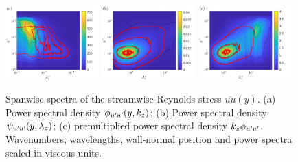 \begin{figure}[h!]
\centering
\includegraphics[width=0.32\textwidth ]{imgs/spec/ZPG_Ret_500_2000_PSdkz_kz_ltau_y_ltau.jpg}
\includegraphics[width=0.32\textwidth]{imgs/spec/ZPG_Ret_500_2000_PSdlambdaz_lambdaz_ltau_y_ltau.jpg}
\includegraphics[width=0.32\textwidth]{imgs/spec/ZPG_Ret_500_2000_kPSdkz_lambdaz_ltau_y_ltau.jpg}
\caption{ \label{fig:PS_PSD} Spanwise spectra of the streamwise Reynolds stress $\overline{uu}(y)$. (a) Power spectral density $\phi_{u^{\prime}\mkern-1.2mu u^{\prime}\mkern-1.2mu}(y,k_z)$; (b) Power spectral density $\psi_{u^{\prime}\mkern-1.2mu u^{\prime}\mkern-1.2mu}(y,\lambda_z)$; (c) premultiplied power spectral density $k_z\phi_{u^{\prime}\mkern-1.2mu u^{\prime}\mkern-1.2mu}$. Wavenumbers, wavelengths, wall-normal position and power spectra scaled in viscous units.}
\end{figure}

